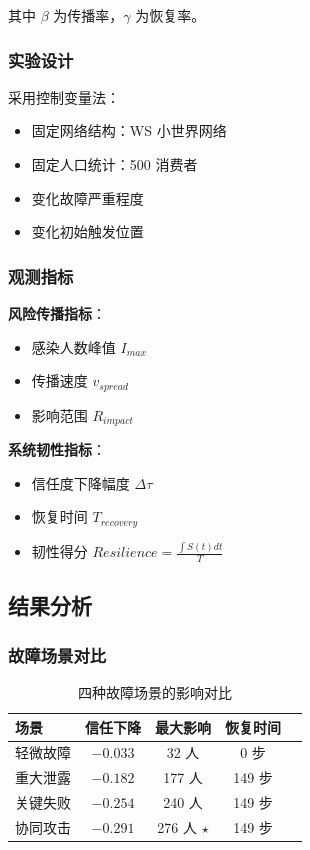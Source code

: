 \documentclass[a4paper,12pt]{article}
\begin{document}
其中 $\beta$ 为传播率，$\gamma$ 为恢复率。

\subsubsection{实验设计}

采用控制变量法：
\begin{itemize}
    \item 固定网络结构：WS 小世界网络
    \item 固定人口统计：500 消费者
    \item 变化故障严重程度
    \item 变化初始触发位置
\end{itemize}

\subsubsection{观测指标}

\textbf{风险传播指标}：
\begin{itemize}
    \item 感染人数峰值 $I_{max}$
    \item 传播速度 $v_{spread}$
    \item 影响范围 $R_{impact}$
\end{itemize}

\textbf{系统韧性指标}：
\begin{itemize}
    \item 信任度下降幅度 $\Delta \tau$
    \item 恢复时间 $T_{recovery}$
    \item 韧性得分 $Resilience = \frac{\int S(t) dt}{T}$
\end{itemize}

\subsection{结果分析}

\subsubsection{故障场景对比}

\begin{table}[H]
\centering
\caption{四种故障场景的影响对比}
\begin{tabular}{lcccc}
\toprule
\textbf{场景} & \textbf{信任下降} & \textbf{最大影响} & \textbf{恢复时间} \\
\midrule
轻微故障 & $-0.033$ & 32 人 & 0 步 \\
重大泄露 & $-0.182$ & 177 人 & 149 步 \\
关键失败 & $-0.254$ & 240 人 & 149 步 \\
协同攻击 & $-0.291$ & 276 人 $\star$ & 149 步 \\
\bottomrule
\end{tabular}
\end{table}
\end{document}
